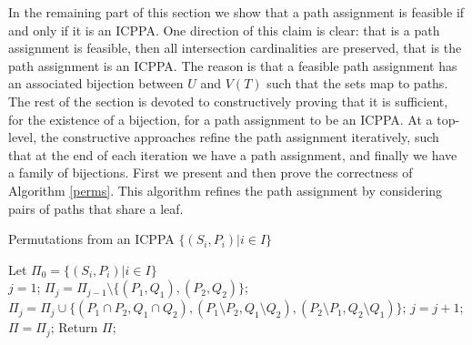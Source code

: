 \documentclass[MS]             %
              {iitmdiss_as}    %
\begin{document}
\noindent
In the remaining part of this section we show that a path assignment
is feasible if and only if it is an ICPPA.  One direction of this
claim is clear: that is a path assignment is feasible, then all
intersection cardinalities are preserved, that is the path assignment
is an ICPPA.  The reason is that a feasible path assignment has an
associated bijection between $U$ and $V(T)$ such that the sets map to
paths.  The rest of the section is devoted to constructively proving
that it is sufficient, for the existence of a bijection, for a path
assignment to be an ICPPA.  At a top-level, the constructive
approaches refine the path assignment iteratively, such that at the
end of each iteration we have a path assignment, and finally we have a
family of bijections.  First we present and then prove the correctness
of Algorithm \ref{perms}.  This algorithm refines the path assignment
by considering pairs of paths that share a leaf.

\begin{algorithm}[h]
  \caption{Permutations from an ICPPA $\{(S_i,P_i) | i \in I\}$}
  \label{perms}
  \begin{algorithmic}
    \STATE Let $\Pi_0=\{(S_i,P_i)| i \in I\}$\\
    \STATE $j = 1$;
    \label{shareleaf}  \STATE
    $\Pi_j= \Pi_{j-1} \setminus \{(P_1,Q_1),(P_2,Q_2)\}$;
    \label{setbreak}\STATE $\Pi_j = \Pi_j \cup \{(P_1 \cap P_2,Q_1
    \cap Q_2), (P_1 \setminus P_2,Q_1 \setminus Q_2), (P_2 \setminus
    P_1, Q_2 \setminus Q_1)\}$; \STATE $j = j+1$; \ENDWHILE \STATE
    $\Pi = \Pi_j$; \STATE Return $\Pi$;
  \end{algorithmic}
\end{algorithm}
\end{document}
